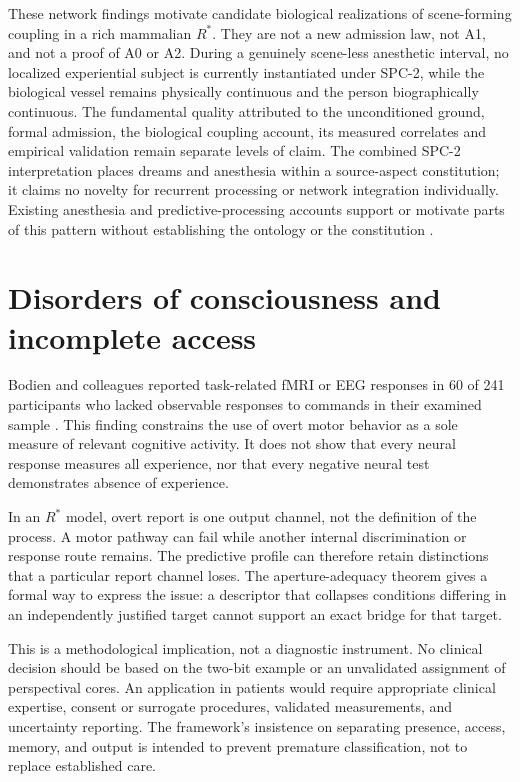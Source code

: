 These network findings motivate candidate biological realizations of scene-forming coupling in a rich mammalian $R^\ast$. They are not a new admission law, not A1, and not a proof of A0 or A2. During a genuinely scene-less anesthetic interval, no localized experiential subject is currently instantiated under SPC-2, while the biological vessel remains physically continuous and the person biographically continuous. The fundamental quality attributed to the unconditioned ground, formal admission, the biological coupling account, its measured correlates and empirical validation remain separate levels of claim. The combined SPC-2 interpretation places dreams and anesthesia within a source-aspect constitution; it claims no novelty for recurrent processing or network integration individually. Existing anesthesia and predictive-processing accounts support or motivate parts of this pattern without establishing the ontology or the constitution \cite{Lee2013,Sarasso2015,CarhartHarrisFriston2019}.

\section{Disorders of consciousness and incomplete access}\label{section:comparative:disorders-of-consciousness-and-incomplete-access}
Bodien and colleagues reported task-related fMRI or EEG responses in 60 of 241 participants who lacked observable responses to commands in their examined sample \cite{Bodien2024}. This finding constrains the use of overt motor behavior as a sole measure of relevant cognitive activity. It does not show that every neural response measures all experience, nor that every negative neural test demonstrates absence of experience.

In an $R^\ast$ model, overt report is one output channel, not the definition of the process. A motor pathway can fail while another internal discrimination or response route remains. The predictive profile can therefore retain distinctions that a particular report channel loses. The aperture-adequacy theorem gives a formal way to express the issue: a descriptor that collapses conditions differing in an independently justified target cannot support an exact bridge for that target.

This is a methodological implication, not a diagnostic instrument. No clinical decision should be based on the two-bit example or an unvalidated assignment of perspectival cores. An application in patients would require appropriate clinical expertise, consent or surrogate procedures, validated measurements, and uncertainty reporting. The framework's insistence on separating presence, access, memory, and output is intended to prevent premature classification, not to replace established care.

